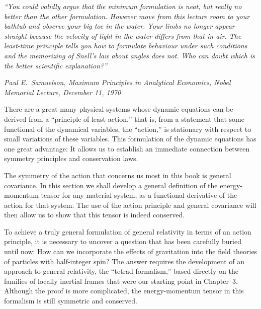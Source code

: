 
\begin{flushleft}
\begin{minipage}{0.37\textwidth}
\raggedright
\itshape
``You could validly argue that the minimum formulation is neat, but really no
better than the other formulation. However move from this lecture room to your
bathtub and observe your big toe in the water. Your limbs no longer appear
straight because the velocity of light in the water differs from that in air.
The least-time principle tells you how to formulate behaviour under such
conditions and the memorizing of Snell's law about angles does not. Who can
doubt which is the better scientific explanation?''

\medskip
\upshape
\textit{Paul E.~Samuelson, Maximum Principles in Analytical Economics, Nobel
Memorial Lecture, December 11, 1970}
\end{minipage}
\end{flushleft}

There are a great many physical systems whose dynamic equations can be
derived from a ``principle of least action,'' that is, from a statement that
some functional of the dynamical variables, the ``action,'' is stationary
with respect to small variations of these variables. This formulation of the
dynamic equations has one great advantage: It allows us to establish an
immediate connection between symmetry principles and conservation laws.

The symmetry of the action that concerns us most in this book is general
covariance. In this section we shall develop a general definition of the
energy-momentum tensor for any material system, as a functional derivative of
the action for that system. The use of the action principle and general
covariance will then allow us to show that this tensor is indeed conserved.

To achieve a truly general formulation of general relativity in terms of an
action principle, it is necessary to uncover a question that has been
carefully buried until now: How can we incorporate the effects of gravitation
into the field theories of particles with half-integer spin? The answer
requires the development of an approach to general relativity, the ``tetrad
formalism,'' based directly on the families of locally inertial frames that
were our starting point in Chapter~3. Although the proof is more complicated,
the energy-momentum tensor in this formalism is still symmetric and
conserved.
